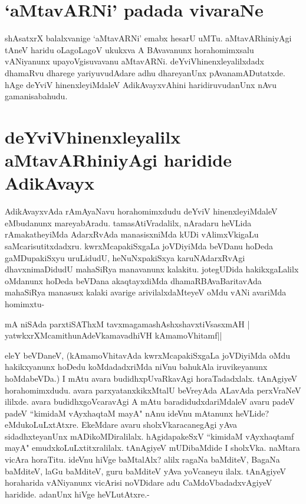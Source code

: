 \section*{`aMtavARNi' padada vivaraNe}

shAsatxrX balalxvanige `aMtavARNi' emabx hesarU uMTu. aMtavARhiniyAgi tAneV haridu oLagoLagoV ukukxva A BAvavanunx horahomimxsalu vANiyanunx upayoVgisuvavanu aMtavARNi. deYviVhinenxleyalilxdadx dhamaRvu dharege yariyuvudAdare adhu dhareyanUnx pAvanamADutatxde. hAge deYviV hinenxleyiMdaleV AdikAvayxvAhini haridiruvudanUnx nAvu gamanisabahudu.

\section*{deYviVhinenxleyalilx aMtavARhiniyAgi haridide AdikAvayx}

AdikAvayxvAda rAmAyaNavu horahomimxdudu deYviV hinenxleyiMdaleV eMbudanunx mareyabAradu. tamasAtiVradalilx, nAradaru heVLida rAmakatheyiMda  AdarxRvAda manasisxniMda kUDi vAlimxVkigaLu saMcarisutitxdadxru. kwrxMcapakiSxgaLa joVDiyiMda beVDanu hoDeda gaMDupakiSxyu uruLidudU, heNuNxpakiSxya karuNAdarxRvAgi dhavxnimaDidudU mahaSiRya manavanunx kalakitu. jotegUDida hakikxgaLalilx oMdanunx hoDeda beVDana akaqtayxdiMda dhamaRBAvaBaritavAda mahaSiRya manasusx kalaki avarige arivilalxdaMteyeV oMdu vANi avariMda homimxtu-
\begin{shloka}
mA niSAda parxtiSAThxM tavxmagamashAshxshavxtiVsasxmAH |\label{20a}\\
yatwkxrXMcamithunAdeVkamavadhiVH kAmamoVhitamf||
\end{shloka}

eleY beVDaneV, (kAmamoVhitavAda kwrxMcapakiSxgaLa joVDiyiMda oMdu hakikxyanunx hoDedu koMdadadxriMda niVnu bahukAla iruvikeyanunx hoMdabeVDa.) I mAtu avara budidhxpUvaRkavAgi horaTadadxlalx. tAnAgiyeV horahomimxdudu. avara parxyatanxkikxMtalU beVreyAda ALavAda perxVraNeV ililxde. avara budidhxgoVcaravAgi A mAtu baradidudxdariMdaleV avaru padeV padeV ``kimidaM vAyxhaqtaM mayA"\label{20} nAnu ideVnu mAtanunx  heVLide? eMdukoLuLxtAtxre. EkeMdare avaru sholxVkaracanegAgi yAva sidadhxteyanUnx mADikoMDiralilalx. hAgidapakeSxV ``kimidaM vAyxhaqtamf mayA" emudxkoLuLxtitxralilalx. tAnAgiyeV mUDibaMdide I sholxVka. naMtara vicAra horaTitu. ideVnu hiVge baMtalAlx? alilx ragaNa baMditeV, BagaNa baMditeV, laGu  baMditeV, guru baMditeV yAva yoVcaneyu ilalx. tAnAgiyeV horaharida vANiyanunx vicArisi noVDidare adu CaMdoVbadadxvAgiyeV haridide. adanUnx hiVge heVLutAtxre.-

